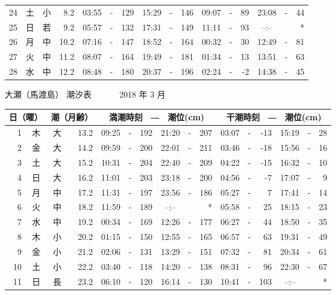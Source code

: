 \documentclass[12pt.a4j]{jsarticle}
\begin{document}
\begin{center}
\begin{table}[ht]
\begin{tabular}{|rc|cr|ccrccr|ccrccr|}
24 & 土 & 小 &  8.2 & 03:55 &-& 129 & 15:29 &-& 146 & 09:07 &-&  89 & 23:08 &-&  44 \\
25 & 日 & 若 &  9.2 & 05:57 &-& 132 & 17:31 &-& 149 & 11:11 &-&  93 & --:-- & &  *  \\
26 & 月 & 中 & 10.2 & 07:16 &-& 147 & 18:52 &-& 164 & 00:32 &-&  30 & 12:49 &-&  81 \\
27 & 火 & 中 & 11.2 & 08:07 &-& 164 & 19:49 &-& 181 & 01:34 &-&  13 & 13:51 &-&  63 \\
28 & 水 & 中 & 12.2 & 08:48 &-& 180 & 20:37 &-& 196 & 02:24 &-&  -2 & 14:38 &-&  45 \\
\hline
\end{tabular}
\end{table}
\newpage
{\LARGE 大瀬（馬渡島）  潮汐表　　　}
{\large 2018 年  3 月}\\
\begin{table}[ht]
\begin{tabular}{|rc|cr|ccrccr|ccrccr|}
\hline
\multicolumn{2}{|c|}{日（曜）} & \multicolumn{2}{c|}{潮（月齢）} & \multicolumn{6}{c|}{満潮時刻　―　潮位(cm)} & \multicolumn{6}{c|}{干潮時刻　―　潮位(cm)} \\
\hline
 1 & 木 & 大 & 13.2 & 09:25 &-& 192 & 21:20 &-& 207 & 03:07 &-& -13 & 15:19 &-&  28 \\
 2 & 金 & 大 & 14.2 & 09:59 &-& 200 & 22:01 &-& 211 & 03:46 &-& -18 & 15:56 &-&  16 \\
 3 & 土 & 大 & 15.2 & 10:31 &-& 204 & 22:40 &-& 209 & 04:22 &-& -15 & 16:32 &-&  10 \\
 4 & 日 & 大 & 16.2 & 11:01 &-& 203 & 23:18 &-& 200 & 04:56 &-&  -7 & 17:07 &-&   9 \\
 5 & 月 & 中 & 17.2 & 11:31 &-& 197 & 23:56 &-& 186 & 05:27 &-&   7 & 17:41 &-&  14 \\
 6 & 火 & 中 & 18.2 & 11:59 &-& 189 & --:-- & &  *  & 05:58 &-&  25 & 18:15 &-&  23 \\
 7 & 水 & 中 & 19.2 & 00:34 &-& 169 & 12:26 &-& 177 & 06:27 &-&  44 & 18:50 &-&  35 \\
 8 & 木 & 小 & 20.2 & 01:15 &-& 150 & 12:55 &-& 165 & 06:57 &-&  63 & 19:31 &-&  49 \\
 9 & 金 & 小 & 21.2 & 02:06 &-& 131 & 13:29 &-& 151 & 07:32 &-&  81 & 20:34 &-&  61 \\
10 & 土 & 小 & 22.2 & 03:40 &-& 118 & 14:20 &-& 138 & 08:31 &-&  96 & 22:30 &-&  67 \\
11 & 日 & 長 & 23.2 & 06:10 &-& 120 & 16:14 &-& 130 & 10:41 &-& 103 & --:-- & &  *  \\

\end{tabular}
\end{table}
\end{center}
\end{document}
